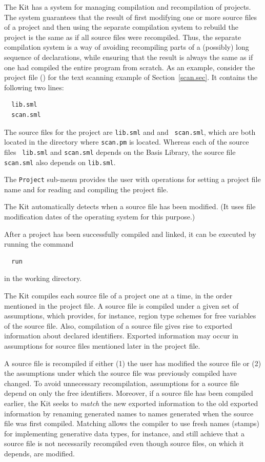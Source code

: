 \documentclass[12pt]{book}
\begin{document}
The Kit has a system for managing compilation and recompilation of
projects.  The system guarantees that the result of first modifying
one or more source files of a project and then using the separate
compilation system to rebuild the project is the same as if all source
files were
recompiled.
%
Thus, the separate compilation system is a way of avoiding recompiling
parts of a (possibly) long sequence of declarations, while ensuring
that the result is always the same as if one had compiled the entire
program from scratch.  As an example, consider the project file () for the text
scanning example of Section~\ref{scan.sec}. It contains the following two lines:
\begin{verbatim}
  lib.sml
  scan.sml
\end{verbatim}

\noindent 
The source files for the project are {\tt lib.sml} and and {\tt
  scan.sml}, which are both located in the directory where 
{\tt scan.pm} is located. Whereas each of the source files {\tt
  lib.sml} and {\tt scan.sml} depends on the Basis Library, the source
file {\tt scan.sml} also depends on {\tt lib.sml}.

The {\tt Project} sub-menu provides the user with operations for
setting a project file name and for reading and compiling the project
file.

The Kit automatically detects  when a source file
has been modified. (It uses file modification dates of the operating
system for this purpose.) 

After a project has been successfully
compiled and linked, it can be executed by running the
command
\begin{verbatim}
  run
\end{verbatim}
in the working directory.  

The Kit compiles each source file of a project one at a time, in the
order mentioned in the project file. A source file is compiled under
a given set of assumptions, which provides, for instance, region type
schemes for free variables of the source file. Also, compilation of a
source file gives rise to exported information about declared
identifiers. Exported information may occur in assumptions for source
files mentioned later in the project file.

A source file is recompiled if either (1) the user has modified the
source file or (2) the assumptions under which the source file was
previously compiled have changed. To avoid unnecessary recompilation,
assumptions for a source file depend on only the free identifiers.
Moreover, if a source file has been compiled earlier, the Kit 
seeks to {\em match\/} the new exported information to
the old exported information by renaming generated names to names
generated when the source file was first compiled. Matching allows the
compiler to use fresh names (stamps) for implementing generative data
types, for instance, and still achieve that a source file is not
necessarily recompiled even though source files, on which it depends,
are modified.
\end{document}
